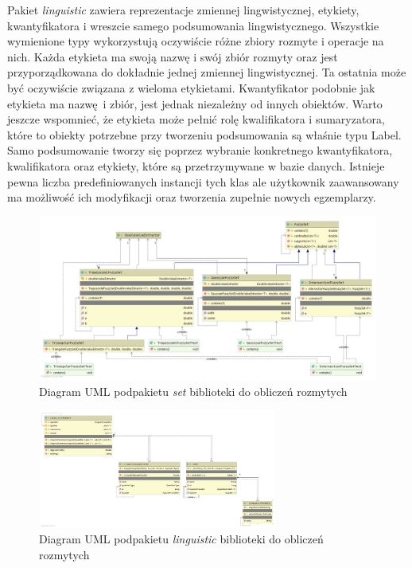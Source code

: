 \documentclass{classrep}
\begin{document}
{{            Pakiet \emph{linguistic} zawiera reprezentacje zmiennej lingwistycznej, etykiety, kwantyfikatora i wreszcie
            samego podsumowania lingwistycznego. Wszystkie wymienione typy wykorzystują oczywiście różne zbiory rozmyte i
            operacje na nich. Każda etykieta ma swoją nazwę i swój zbiór rozmyty oraz jest przyporządkowana do dokładnie
            jednej zmiennej lingwistycznej. Ta ostatnia może być oczywiście związana z wieloma etykietami. Kwantyfikator
            podobnie jak etykieta ma nazwę i zbiór, jest jednak niezależny od innych obiektów. Warto jeszcze wspomnieć, że
            etykieta może pełnić rolę kwalifikatora i sumaryzatora, które to obiekty potrzebne przy tworzeniu podsumowania są
            właśnie typu Label. Samo podsumowanie tworzy się poprzez wybranie konkretnego kwantyfikatora, kwalifikatora oraz
            etykiety, które są przetrzymywane w bazie danych. Istnieje pewna liczba predefiniowanych instancji tych klas ale
            użytkownik zaawansowany ma możliwość ich modyfikacji oraz tworzenia zupełnie nowych egzemplarzy.
            \begin{figure}[!htbp]
                \centering
                \includegraphics[width=\textwidth]{img/uml/logic_fuzzy_set.png}
                \caption{Diagram UML podpakietu \emph{set} biblioteki do obliczeń rozmytych}
            \end{figure}
            \FloatBarrier
            \begin{figure}[!htbp]
                \centering
                \includegraphics[width=0.7\textwidth]{img/uml/logic_fuzzy_linguistic.png}
                \caption{Diagram UML podpakietu \emph{linguistic} biblioteki do obliczeń rozmytych}
            \end{figure}
            \FloatBarrier
        }

}
\end{document}

